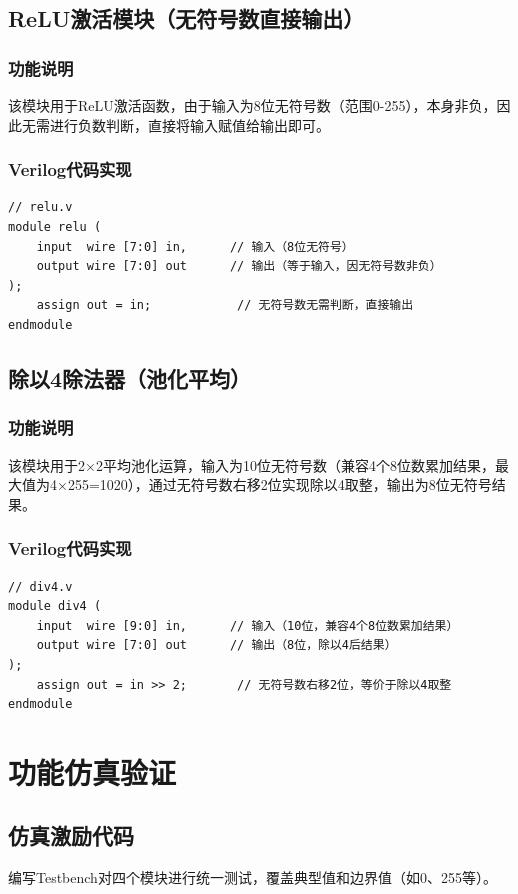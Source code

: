 \documentclass{ctexart}
\begin{document}
\subsection{ReLU激活模块（无符号数直接输出）}
\subsubsection{功能说明}
该模块用于ReLU激活函数，由于输入为8位无符号数（范围0-255），本身非负，因此无需进行负数判断，直接将输入赋值给输出即可。

\subsubsection{Verilog代码实现}
\begin{lstlisting}[style=verilog, caption=relu.v]
// relu.v
module relu (
    input  wire [7:0] in,      // 输入（8位无符号）
    output wire [7:0] out      // 输出（等于输入，因无符号数非负）
);
    assign out = in;            // 无符号数无需判断，直接输出
endmodule
\end{lstlisting}

\subsection{除以4除法器（池化平均）}
\subsubsection{功能说明}
该模块用于2×2平均池化运算，输入为10位无符号数（兼容4个8位数累加结果，最大值为4×255=1020），通过无符号数右移2位实现除以4取整，输出为8位无符号结果。

\subsubsection{Verilog代码实现}
\begin{lstlisting}[style=verilog, caption=div4.v]
// div4.v
module div4 (
    input  wire [9:0] in,      // 输入（10位，兼容4个8位数累加结果）
    output wire [7:0] out      // 输出（8位，除以4后结果）
);
    assign out = in >> 2;       // 无符号数右移2位，等价于除以4取整
endmodule
\end{lstlisting}

\section{功能仿真验证}

\subsection{仿真激励代码}
编写Testbench对四个模块进行统一测试，覆盖典型值和边界值（如0、255等）。
\end{document}

